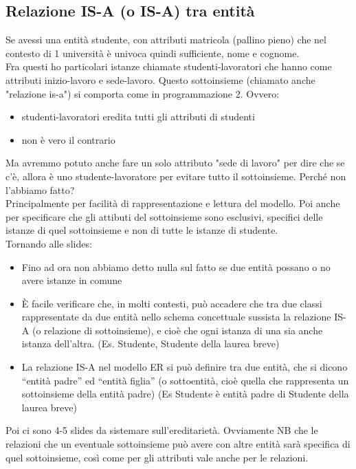 \subsection{Relazione IS-A (o IS-A) tra entità}
Se avessi una entità studente, con attributi matricola (pallino pieno) che nel contesto di 1 università è univoca quindi sufficiente, nome e cognome.
\\Fra questi ho particolari istanze chiamate studenti-lavoratori che hanno come attributi inizio-lavoro e sede-lavoro. Questo sottoinsieme (chiamato anche "relazione is-a") si comporta come in programmazione 2. Ovvero:
\begin{itemize}
    \item studenti-lavoratori eredita tutti gli attributi di studenti
    \item non è vero il contrario
\end{itemize}
Ma avremmo potuto anche fare un solo attributo "sede di lavoro" per dire che se c'è, allora è uno studente-lavoratore per evitare tutto il sottoinsieme. Perché non l'abbiamo fatto?
\\Principalmente per facilità di rappresentazione e lettura del modello. Poi anche per specificare che gli attibuti del sottoinsieme sono esclusivi, specifici delle istanze di quel sottoinsieme e non di tutte le istanze di studente.
\\Tornando alle slides:
\begin{itemize}
    \item Fino ad ora non abbiamo detto nulla sul fatto se due
    entità possano o no avere istanze in comune
    \item \`E facile verificare che, in molti contesti, può accadere che tra due classi rappresentate da due entità nello schema concettuale sussista la relazione IS-A (o relazione di sottoinsieme), e cioè che ogni istanza di una sia anche istanza dell'altra. (Es. Studente, Studente della laurea breve)
    \item La relazione IS-A nel modello ER si può definire tra
    due entità, che si dicono “entità padre” ed “entità figlia” (o sottoentità, cioè quella che rappresenta un sottoinsieme della entità padre) (Es Studente è entità padre di Studente della laurea breve)
\end{itemize}
Poi ci sono 4-5 slides da sistemare sull'ereditarietà. Ovviamente NB che le relazioni che un eventuale sottoinsieme può avere con altre entità sarà specifica di quel sottoinsieme, così come per gli attributi vale anche per le relazioni.

